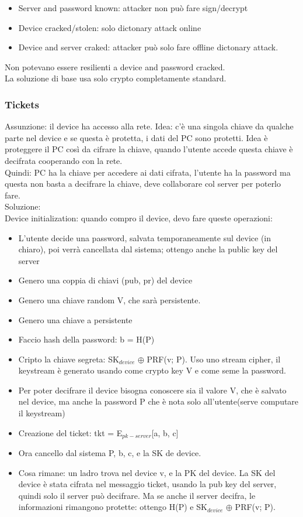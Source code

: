 \documentclass[16px]{article}
\begin{document}
\begin{itemize}
\item Server and password known: attacker non può fare sign/decrypt
\item Device cracked/stolen: solo dictonary attack online
\item Device and server craked: attacker può solo fare offline dictonary attack.
\end{itemize}
Non potevano essere resilienti a device and password cracked.\\ La soluzione di base usa solo crypto completamente standard.
\subsubsection{Tickets}
Assunzione: il device ha accesso alla rete. Idea: c'è una singola chiave da qualche parte nel device e se questa è protetta, i dati del PC sono protetti. Idea è proteggere il PC così da cifrare la chiave, quando l'utente accede questa chiave è decifrata cooperando con la rete.\\ Quindi: PC ha la chiave per accedere ai dati cifrata, l'utente ha la password ma questa non basta a decifrare la chiave, deve collaborare col server per poterlo fare.\\ Soluzione:\\ Device initialization: quando compro il device, devo fare queste operazioni:
\begin{itemize}
\item L'utente decide una password, salvata temporaneamente sul device (in chiaro), poi verrà cancellata dal sistema; ottengo anche la public key del server
\item Genero una coppia di chiavi (pub, pr) del device
\item Genero una chiave random V, che sarà persistente.
\item Genero una chiave a persistente
\item Faccio hash della password: b = H(P)
\item Cripto la chiave segreta: SK$_{device}$ $\oplus$ PRF(v; P). Uso uno stream cipher, il keystream è generato usando come crypto key V e come seme la password.
\item Per poter decifrare il device bisogna conoscere sia il valore V, che è salvato nel device, ma anche la password P che è nota solo all'utente(serve computare il keystream)
\item Creazione del ticket: tkt = E$_{pk-server}$[a, b, c]
\item Ora cancello dal sistema P, b, c, e la SK de device.
\item Cosa rimane: un ladro trova nel device v, e la PK del device. La SK del device è stata cifrata nel messaggio ticket, usando la pub key del server, quindi solo il server può decifrare. Ma se anche il server decifra, le informazioni rimangono protette: ottengo H(P) e SK$_{device}$ $\oplus$ PRF(v; P).
\end{itemize}
\end{document}
